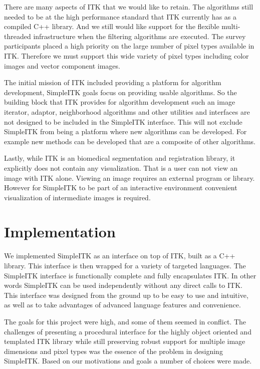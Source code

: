 \documentclass{frontiersMED} %
\begin{document}
There are many aspects of ITK that we would like to retain. The
algorithms still needed to be at the high performance standard that
ITK currently has as a compiled C++ library. And we still would like
support for the flexible multi-threaded infrastructure when the
filtering algorithms are executed. The survey participants placed a
high priority on the large number of pixel types available in
ITK. Therefore we must support this wide variety of pixel types
including color images and vector component images.

The initial mission of ITK included providing a platform for algorithm
development, SimpleITK goals focus on providing usable algorithms. So
the building block that ITK provides for algorithm development such an
image iterator, adaptor, neighborhood algorithms and other utilities
and interfaces are not designed to be included in the SimpleITK
interface. This will not exclude SimpleITK from being a platform where
new algorithms can be developed. For example new methods can be
developed that are a composite of other algorithms.

Lastly, while ITK is an biomedical segmentation and registration
library, it explicitly does not contain any visualization. That is a
user can not view an image with ITK alone. Viewing an image requires
an external program or library. However for SimpleITK to be part of an
interactive environment convenient visualization of intermediate
images is required.

\section{Implementation}

We implemented SimpleITK as an interface on top of ITK, built as a C++
library. This interface is then wrapped for a variety of targeted
languages. The SimpleITK interface is functionally complete and fully
encapsulates ITK.  In other words SimpleITK can be used independently
without any direct calls to ITK. This interface was designed from the
ground up to be easy to use and intuitive, as well as to take
advantages of advanced language features and convenience.

The goals for this project were high, and some of them seemed in
conflict. The challenges of presenting a procedural interface for the
highly object oriented and templated ITK library while still
preserving robust support for multiple image dimensions and pixel
types was the essence of the problem in designing SimpleITK. Based on
our motivations and goals a number of choices were made.
\end{document}
